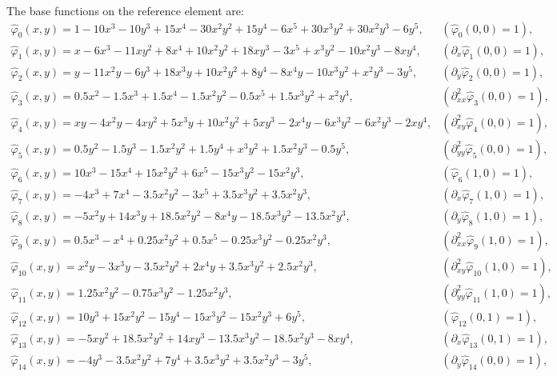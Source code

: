 \documentclass[10pt,a4paper]{article}
\begin{document}
The base functions on the reference element are:
$$ \begin{array}{ll}
\hat{\varphi}_{0}(x,y) = 1 - 10x^3 - 10y^3 + 15x^4 - 30x^2y^2 + 15y^4 - 6x^5 + 30x^3y^2 + 30x^2y^3 - 6y^5, & (\hat{\varphi}_0(0,0) = 1), \\
\hat{\varphi}_{1}(x,y) = x - 6x^3 - 11xy^2 + 8x^4 + 10x^2y^2 + 18xy^3 - 3x^5 + x^3y^2 - 10x^2y^3 - 8xy^4, & (\partial_x\hat{\varphi}_1(0,0) = 1),\\
\hat{\varphi}_{2}(x,y) = y - 11x^2y - 6y^3 + 18x^3y + 10x^2y^2 + 8y^4 - 8x^4y - 10x^3y^2 + x^2y^3 - 3y^5, & (\partial_y\hat{\varphi}_2(0,0) = 1),\\
\hat{\varphi}_{3}(x,y) = 0.5x^2 - 1.5x^3 + 1.5x^4 - 1.5x^2y^2 - 0.5x^5 + 1.5x^3y^2 + x^2y^3, & (\partial^2_{xx}\hat{\varphi}_3(0,0) = 1),\\
\hat{\varphi}_{4}(x,y) = xy - 4x^2y - 4xy^2 + 5x^3y + 10x^2y^2 + 5xy^3 - 2x^4y - 6x^3y^2 - 6x^2y^3 - 2xy^4, & (\partial^2_{xy}\hat{\varphi}_{4}(0,0) = 1),\\
\hat{\varphi}_{5}(x,y) = 0.5y^2 - 1.5y^3 - 1.5x^2y^2 + 1.5y^4 + x^3y^2 + 1.5x^2y^3 - 0.5y^5, & (\partial^2_{yy}\hat{\varphi}_{5}(0,0) = 1),\\
\hat{\varphi}_{6}(x,y) = 10x^3 - 15x^4 + 15x^2y^2 + 6x^5 - 15x^3y^2 - 15x^2y^3, & (\hat{\varphi}_6(1,0) = 1),\\
\hat{\varphi}_{7}(x,y) = -4x^3 + 7x^4 - 3.5x^2y^2 - 3x^5 + 3.5x^3y^2 + 3.5x^2y^3, & (\partial_x\hat{\varphi}_7(1,0) = 1),\\
\hat{\varphi}_{8}(x,y) = -5x^2y + 14x^3y + 18.5x^2y^2 - 8x^4y - 18.5x^3y^2 - 13.5x^2y^3, & (\partial_y\hat{\varphi}_8(1,0) = 1),\\
\hat{\varphi}_{9}(x,y) = 0.5x^3 - x^4 + 0.25x^2y^2 + 0.5x^5 - 0.25x^3y^2 - 0.25x^2y^3, & (\partial^2_{xx}\hat{\varphi}_{9}(1,0) = 1),\\
\hat{\varphi}_{10}(x,y) = x^2y - 3x^3y - 3.5x^2y^2 + 2x^4y + 3.5x^3y^2 + 2.5x^2y^3, & (\partial^2_{xy}\hat{\varphi}_{10}(1,0) = 1),\\
\hat{\varphi}_{11}(x,y) = 1.25x^2y^2 - 0.75x^3y^2 - 1.25x^2y^3, & (\partial^2_{yy}\hat{\varphi}_{11}(1,0) = 1),\\
\hat{\varphi}_{12}(x,y) = 10y^3 + 15x^2y^2 - 15y^4 - 15x^3y^2 - 15x^2y^3 + 6y^5, & (\hat{\varphi}_{12}(0,1) = 1),\\
\hat{\varphi}_{13}(x,y) = -5xy^2 + 18.5x^2y^2 + 14xy^3 - 13.5x^3y^2 - 18.5x^2y^3 - 8xy^4, & (\partial_x\hat{\varphi}_{13}(0,1) = 1),\\
\hat{\varphi}_{14}(x,y) = -4y^3 - 3.5x^2y^2 + 7y^4 + 3.5x^3y^2 + 3.5x^2y^3 - 3y^5, & (\partial_y\hat{\varphi}_{14}(0,0) = 1),\\

\end{array}$$
\end{document}
